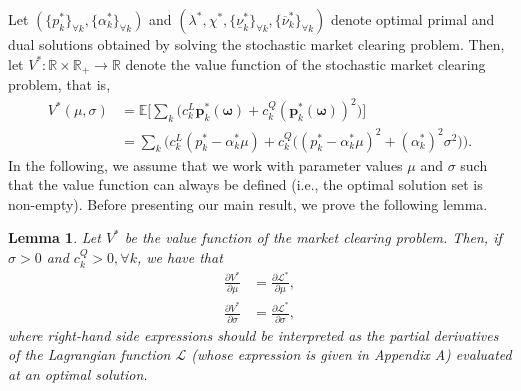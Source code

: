 \documentclass{article}
\newtheorem{lemma}{Lemma}
\begin{document}
Let $(\{p_k^*\}_{\forall k}, \{\alpha_k^*\}_{\forall k})$ and $(\lambda^*, \chi^*, \{\underline{\nu}_k^*\}_{\forall k}, \{\overline{\nu}_k^*\}_{\forall k})$ denote optimal primal and dual solutions obtained by solving the stochastic market clearing problem. Then, let $V^*: \mathbb{R} \times \mathbb{R}_+ \rightarrow \mathbb{R}$ denote the value function of the stochastic market clearing problem, that is, 
\begin{align*}
V^*(\mu, \sigma) &= \mathbb{E}\Big[\sum_k \big(c_k^L \mathbf{p}_k^*(\boldsymbol{\omega}) + c_k^Q (\mathbf{p}_k^*(\boldsymbol{\omega}))^2\big)\Big]\\
 &= \sum_k \Big(c_k^L(p_k^* - \alpha_k^* \mu) + c_k^Q \big((p_k^* - \alpha_k^* \mu)^2 + (\alpha_k^*)^2 \sigma^2\big)\Big).
\end{align*}
In the following, we assume that we work with parameter values $\mu$ and $\sigma$ such that the value function can always be defined (i.e., the optimal solution set is non-empty). Before presenting our main result, we prove the following lemma.
\begin{lemma}\label{lemma1}
Let $V^*$ be the value function of the market clearing problem. Then, if $\sigma > 0$ and $c_k^Q > 0, \forall k$, we have that
\begin{align*}
\frac{\partial V^*}{\partial \mu} &= \frac{\partial \mathcal{L}^*}{\partial \mu},\\
\frac{\partial V^*}{\partial \sigma} &= \frac{\partial \mathcal{L}^*}{\partial \sigma},
\end{align*}
where right-hand side expressions should be interpreted as the partial derivatives of the Lagrangian function $\mathcal{L}$ (whose expression is given in Appendix A) evaluated at an optimal solution.
\end{lemma}
\end{document}
